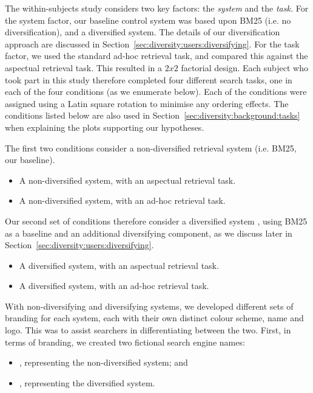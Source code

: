 The within-subjects study considers two key factors: the \emph{system} and the \emph{task.} For the system factor, our baseline control system was based upon BM25 (i.e. no diversification), and a diversified system. The details of our diversification approach are discussed in Section~\ref{sec:diversity:users:diversifying}. For the task factor, we used the standard ad-hoc retrieval task, and compared this against the aspectual retrieval task. This resulted in a $2x2$ factorial design. Each subject who took part in this study therefore completed four different search tasks, one in each of the four conditions (as we enumerate below). Each of the conditions were assigned using a Latin square rotation to minimise any ordering effects. The conditions listed below are also used in Section~\ref{sec:diversity:background:tasks} when explaining the plots supporting our hypotheses.

The first two conditions consider a non-diversified retrieval system  (i.e. BM25, our baseline).

\begin{itemize}
    \item{ A non-diversified system, with an aspectual retrieval task.}
    \item{ A non-diversified system, with an ad-hoc retrieval task.}
\end{itemize}

Our second set of conditions therefore consider a diversified system , using BM25 as a baseline and an additional diversifying component, as we discuss later in Section~\ref{sec:diversity:users:diversifying}.

\begin{itemize}
    \item{ A diversified system, with an aspectual retrieval task.}
    \item{ A diversified system, with an ad-hoc retrieval task.}
\end{itemize}

With non-diversifying and diversifying systems, we developed different sets of branding for each system, each with their own distinct colour scheme, name and logo. This was to assist searchers in differentiating between the two. First, in terms of branding, we created two fictional search engine names:

\begin{itemize}
    \item{, representing the non-diversified  system; and}
    \item{, representing the diversified  system.}
\end{itemize}

